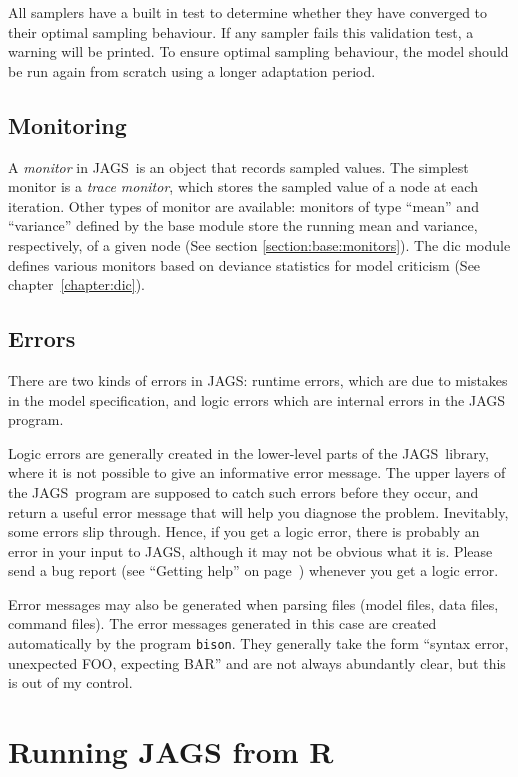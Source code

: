 \documentclass[11pt, a4paper, titlepage]{report}
\newcommand{\JAGS}{\textsf{JAGS}}
\newcommand{\R}{\textsf{R}}
\begin{document}
All samplers have a built in test to determine whether they have
converged to their optimal sampling behaviour.  If any sampler fails
this validation test, a warning will be printed. To ensure optimal
sampling behaviour, the model should be run again from scratch using a
longer adaptation period.

\section{Monitoring}
\label{section:monitoring}

A {\em monitor} in \JAGS\ is an object that records sampled
values. The simplest monitor is a {\em trace monitor}, which stores
the sampled value of a node at each iteration. Other types of monitor
are available: monitors of type ``mean'' and ``variance'' defined by
the base module store the running mean and variance, respectively,
of a given node (See section \ref{section:base:monitors}). The dic module
defines various monitors based on deviance statistics for model
criticism (See chapter~\ref{chapter:dic}).

\section{Errors}

There are two kinds of errors in \JAGS: runtime errors, which are due to
mistakes in the model specification, and logic errors which are internal
errors in the JAGS program. 

Logic errors are generally created in the lower-level parts of the
\JAGS\ library, where it is not possible to give an informative error
message.  The upper layers of the \JAGS\ program are supposed to catch
such errors before they occur, and return a useful error message that
will help you diagnose the problem.  Inevitably, some errors slip
through. Hence, if you get a logic error, there is probably an error
in your input to \JAGS, although it may not be obvious what it
is. Please send a bug report (see ``Getting help'' on
page~\pageref{section:help}) whenever you get a logic error.

Error messages may also be generated when parsing files (model files,
data files, command files).  The error messages generated in this case
are created automatically by the program \texttt{bison}. They
generally take the form ``syntax error, unexpected FOO, expecting BAR''
and are not always abundantly clear, but this is out of my control.

\chapter{Running JAGS from \R}
\label{chapter:R} 
\end{document}
